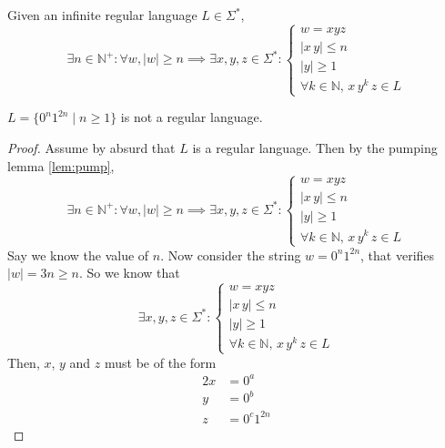 \documentclass[docid=TP07]{tcom_TP}
\begin{document}
\setcounter{chapter}{6}
{
\renewcommand{\thesubsubsection}{\thesubsection\alph{subsubsection}}
\begin{lemma} \label{lem:pump}
Given an infinite regular language $L \in \Sigma^*$,
\begin{equation*}
	\exists n \in \mathbb{N}^+ \colon \forall w, |w|\geq n \implies \exists x, y, z \in \Sigma^* \colon 
	\begin{cases}
		w = xyz \\
		|x\,y| \leq n\\
		|y| \geq 1\\
		\forall k \in \mathbb{N},\,x\,y^k\,z \in L
	\end{cases}
\end{equation*} 
\end{lemma}
\begin{theorem}
	$L=\{0^n1^{2n}\mid n\geq 1\}$ is not a regular language.
\end{theorem}
\begin{proof}
Assume by absurd that $L$ is a regular language. Then by the pumping lemma \eqref{lem:pump},
\begin{equation*}
	\exists n \in \mathbb{N}^+ \colon \forall w, |w|\geq n \implies \exists x, y, z \in \Sigma^* \colon 
	\begin{cases}
		w = xyz \\
		|x\,y| \leq n\\
		|y| \geq 1\\
		\forall k \in \mathbb{N},\,x\,y^k\,z \in L
\end{cases}
\end{equation*}
Say we know the value of $n$. Now consider the string $w=0^n1^{2n}$, that verifies $|w|=3n \geq n$. So we know that
\begin{equation*}
\exists x, y, z \in \Sigma^* \colon 
\begin{cases}
	w = xyz \\
	|x\,y| \leq n\\
	|y| \geq 1\\
	\forall k \in \mathbb{N},\,x\,y^k\,z \in L
\end{cases}
\end{equation*}
Then, $x$, $y$ and $z$ must be of the form
\begin{alignat*}{2}
	x &= 0^a\\
	y &= 0^b\\
	z &= 0^c1^{2n}
\end{alignat*}

\end{proof}}
\end{document}
